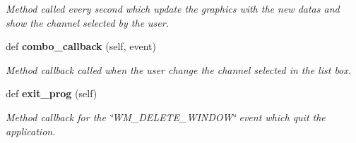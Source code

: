 \begin{DoxyCompactItemize}
\begin{DoxyCompactList}\small\item\em Method called every second which update the graphics with the new datas and show the channel selected by the user. \end{DoxyCompactList}\item 
def \textbf{ combo\+\_\+callback} (self, event)
\begin{DoxyCompactList}\small\item\em Method callback called when the user change the channel selected in the list box. \end{DoxyCompactList}\item 
def \textbf{ exit\+\_\+prog} (self)
\begin{DoxyCompactList}\small\item\em Method callback for the \char`\"{}\+W\+M\+\_\+\+D\+E\+L\+E\+T\+E\+\_\+\+W\+I\+N\+D\+O\+W\char`\"{} event which quit the application. \end{DoxyCompactList}\end{DoxyCompactItemize}
